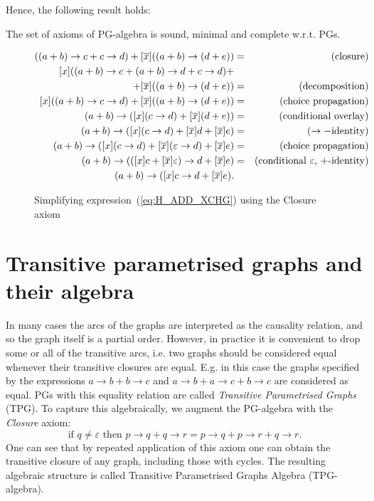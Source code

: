 Hence, the following result holds:
\begin{thm}
 The set of axioms of PG-algebra
is sound, minimal and complete w.r.t. PGs.
\end{thm}
\begin{figure}

\begin{eqnarray*}
[x]((a+b)\rightarrow c+c\rightarrow d)+[\overline{x}]((a+b)\rightarrow(d+e)) & = & (\textrm{closure)}\\
{}[x]((a+b)\rightarrow c+(a+b)\rightarrow d+c\rightarrow d)+\\+[\overline{x}]((a+b)\rightarrow(d+e)) & = & (\textrm{decomposition)}\\
{}[x]((a+b)\rightarrow c\rightarrow d)+[\overline{x}]((a+b)\rightarrow(d+e)) & = & (\textrm{choice propagation)}\\
(a+b)\rightarrow([x](c\rightarrow d)+[\overline{x}](d+e)) & = & (\textrm{conditional overlay)}\\
(a+b)\rightarrow([x](c\rightarrow d)+[\overline{x}]d+[\overline{x}]e) & = & (\rightarrow-\textrm{identity)}\\
(a+b)\rightarrow([x](c\rightarrow d)+[\overline{x}](\varepsilon\rightarrow d)+[\overline{x}]e) & = & (\textrm{choice propagation)}\\
(a+b)\rightarrow(([x]c+[\overline{x}]\varepsilon)\rightarrow d+[\overline{x}]e) & = & (\textrm{conditional \ensuremath{\varepsilon}, +-\textrm{identity)}}\\
(a+b)\rightarrow([x]c\rightarrow d+[\overline{x}]e).
\end{eqnarray*}


\caption{Simplifying expression~(\ref{eq:H_ADD_XCHG}) using the Closure axiom\label{fig:Simplifying-TPG-expressions}}
\end{figure}



\section{Transitive parametrised graphs and their algebra}

In many cases the arcs of the graphs are interpreted as the causality
relation, and so the graph itself is a partial order. However, in
practice it is convenient to drop some or all of the transitive arcs,
i.e. two graphs should be considered equal whenever their transitive
closures are equal. E.g. in this case the graphs specified by the
expressions $a\rightarrow b+b\rightarrow c$ and $a\rightarrow b+a\rightarrow c+b\rightarrow c$
are considered as equal. PGs with this equality relation are called
\emph{Transitive Parametrised Graphs} (TPG). To capture this algebraically,
we augment the PG-algebra with the \emph{Closure} axiom:
\[
\mbox{{if\ }}q\neq\varepsilon\mbox{{\ then\ }}p\!\rightarrow\! q+q\!\rightarrow\! r=p\!\rightarrow\! q+p\!\rightarrow\! r+q\!\rightarrow\! r.
\]
One can see that by repeated application of this axiom one can obtain
the transitive closure of any graph, including those with cycles.
The resulting algebraic structure is called Transitive Parametrised Graphs Algebra
(TPG-algebra).

